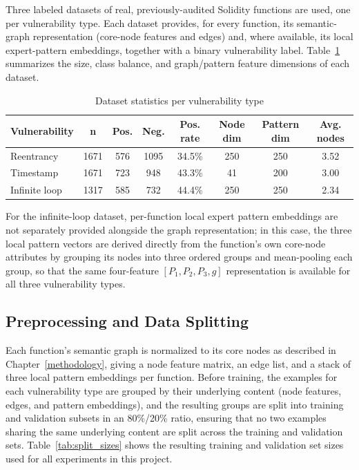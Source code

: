 \documentclass[12pt, a4paper, openright, twoside]{report}
\begin{document}
Three labeled datasets of real, previously-audited Solidity functions are used, one per vulnerability type. Each dataset provides, for every function, its semantic-graph representation (core-node features and edges) and, where available, its local expert-pattern embeddings, together with a binary vulnerability label. Table~\ref{tab:dataset_stats} summarizes the size, class balance, and graph/pattern feature dimensions of each dataset.

\begin{table}[htbp]
\centering
\caption{Dataset statistics per vulnerability type}
\label{tab:dataset_stats}
\begin{tabular}{|l|c|c|c|c|c|c|c|}
\hline
\textbf{Vulnerability} & \textbf{n} & \textbf{Pos.} & \textbf{Neg.} & \textbf{Pos. rate} & \textbf{Node dim} & \textbf{Pattern dim} & \textbf{Avg. nodes} \\ \hline
Reentrancy & 1671 & 576 & 1095 & 34.5\% & 250 & 250 & 3.52 \\ \hline
Timestamp  & 1671 & 723 & 948  & 43.3\% & 41  & 200 & 3.00 \\ \hline
Infinite loop & 1317 & 585 & 732 & 44.4\% & 250 & 250 & 2.34 \\ \hline
\end{tabular}
\end{table}

For the infinite-loop dataset, per-function local expert pattern embeddings are not separately provided alongside the graph representation; in this case, the three local pattern vectors are derived directly from the function's own core-node attributes by grouping its nodes into three ordered groups and mean-pooling each group, so that the same four-feature $[P_1,P_2,P_3,g]$ representation is available for all three vulnerability types.

\subsection{Preprocessing and Data Splitting}

Each function's semantic graph is normalized to its core nodes as described in Chapter~\ref{methodology}, giving a node feature matrix, an edge list, and a stack of three local pattern embeddings per function. Before training, the examples for each vulnerability type are grouped by their underlying content (node features, edges, and pattern embeddings), and the resulting groups are split into training and validation subsets in an 80\%/20\% ratio, ensuring that no two examples sharing the same underlying content are split across the training and validation sets. Table~\ref{tab:split_sizes} shows the resulting training and validation set sizes used for all experiments in this project.
\end{document}
